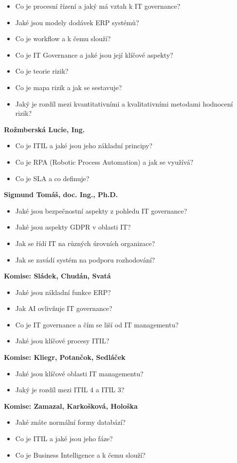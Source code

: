 \begin{profesorbox}
\begin{itemize}
  \item Co je procesní řízení a jaký má vztah k IT governance?
  \item Jaké jsou modely dodávek ERP systémů?
  \item Co je workflow a k čemu slouží?
  \item Co je IT Governance a jaké jsou její klíčové aspekty?
  \item Co je teorie rizik?
  \item Co je mapa rizik a jak se sestavuje?
  \item Jaký je rozdíl mezi kvantitativními a kvalitativními metodami hodnocení rizik?
\end{itemize}
\textbf{Rožmberská Lucie, Ing.}
\begin{itemize}
  \item Co je ITIL a jaké jsou jeho základní principy?
  \item Co je RPA (Robotic Process Automation) a jak se využívá?
  \item Co je SLA a co definuje?
\end{itemize}
\textbf{Sigmund Tomáš, doc. Ing., Ph.D.}
\begin{itemize}
  \item Jaké jsou bezpečnostní aspekty z pohledu IT governance?
  \item Jaké jsou aspekty GDPR v oblasti IT?
  \item Jak se řídí IT na různých úrovních organizace?
  \item Jak se zavádí systém na podporu rozhodování?
\end{itemize}
\textbf{Komise: Sládek, Chudán, Svatá}
\begin{itemize}
  \item Jaké jsou základní funkce ERP?
  \item Jak AI ovlivňuje IT governance?
  \item Co je IT governance a čím se liší od IT managementu?
  \item Jaké jsou klíčové procesy ITIL?
\end{itemize}
\textbf{Komise: Kliegr, Potančok, Sedláček}
\begin{itemize}
  \item Jaké jsou klíčové oblasti IT managementu?
  \item Jaký je rozdíl mezi ITIL 4 a ITIL 3?
\end{itemize}
\textbf{Komise: Zamazal, Karkošková, Hološka}
\begin{itemize}
  \item Jaké znáte normální formy databází?
  \item Co je ITIL a jaké jsou jeho fáze?
  \item Co je Business Intelligence a k čemu slouží?
\end{itemize}
\end{profesorbox}
